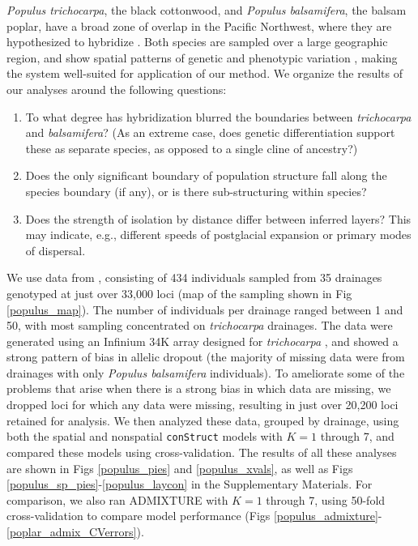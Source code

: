 \documentclass[10pt,letterpaper]{article}
\newcommand{\tri}{\textit{trichocarpa}}
\begin{document}
\textit{Populus trichocarpa}, the black cottonwood,
and \textit{Populus balsamifera}, the balsam poplar,
have a broad zone of overlap in the Pacific Northwest,
where they are hypothesized to hybridize \cite{geraldes_etal_2014, suarezgonzalez_etal_2016}.
Both species are sampled over a large geographic region, 
and show spatial patterns of genetic and phenotypic variation \cite{slavov_etal_2012, mckown_etal_2013},
making the system well-suited for application of our method.
We organize the results of our analyses around the following questions: 
\begin{enumerate}

    \item To what degree has hybridization blurred the boundaries between 
        \textit{trichocarpa} and \textit{balsamifera}?
        (As an extreme case, does genetic differentiation support these as separate species,
        as opposed to a single cline of ancestry?)

    \item Does the only significant boundary of population structure
        fall along the species boundary (if any),
        or is there sub-structuring within species?

    \item Does the strength of isolation by distance differ between inferred layers?
        This may indicate, e.g., different speeds of postglacial expansion
        or primary modes of dispersal.


\end{enumerate}

We use data from \cite{geraldes_etal_2014}, 
consisting of 434 individuals sampled from 35 drainages 
genotyped at just over 33,000 loci (map of the sampling shown in Fig \ref{populus_map}).
The number of individuals per drainage ranged between 1 and 50, 
with most sampling concentrated on \tri{} drainages.
The data were generated using an Infinium 34K array designed for \tri{} \cite{geraldes_2013}, 
and showed a strong pattern of bias in allelic dropout 
(the majority of missing data were from drainages with only \textit{Populus balsamifera} individuals).
To ameliorate some of the problems that arise when there is a strong bias in which data are missing, 
we dropped loci for which any data were missing, 
resulting in just over 20,200 loci retained for analysis.  
We then analyzed these data, grouped by drainage, 
using both the spatial and nonspatial \texttt{conStruct} models with $K = 1$ through 7,
and compared these models using cross-validation.
The results of all these analyses are shown in 
Figs \ref{populus_pies} and \ref{populus_xvals}, 
as well as Figs \ref{populus_sp_pies}-\ref{populus_laycon} in the Supplementary Materials.
For comparison, we also ran ADMIXTURE \cite{ADMIXTURE} 
with $K = 1$ through 7, using 50-fold cross-validation to compare model performance
(Figs \ref{populus_admixture}-\ref{poplar_admix_CVerrors}). 
\end{document}
